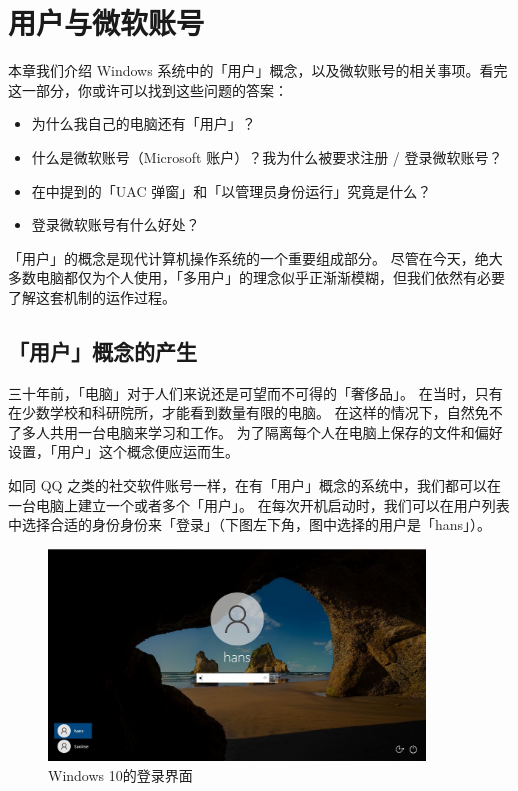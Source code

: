 \chapter{用户与微软账号}
\label{user-and-ms-account}

\begin{intro}
  本章我们介绍 Windows 系统中的「用户」概念，以及微软账号的相关事项。看完这一部分，你或许可以找到这些问题的答案：

  \begin{itemize}
    \item 为什么我自己的电脑还有「用户」？
    \item 什么是微软账号（Microsoft 账户\footnotemark）？我为什么被要求注册 / 登录微软账号？
    \item 在中提到的「UAC 弹窗」和「以管理员身份运行」究竟是什么？
    \item 登录微软账号有什么好处？
  \end{itemize}
\end{intro}

「用户」的概念是现代计算机操作系统的一个重要组成部分。
尽管在今天，绝大多数电脑都仅为个人使用，「多用户」的理念似乎正渐渐模糊，但我们依然有必要了解这套机制的运作过程。

\section{「用户」概念的产生}

三十年前，「电脑」对于人们来说还是可望而不可得的「奢侈品」。
在当时，只有在少数学校和科研院所，才能看到数量有限的电脑。
在这样的情况下，自然免不了多人共用一台电脑来学习和工作。
为了隔离每个人在电脑上保存的文件和偏好设置，「用户」这个概念便应运而生。

如同 QQ 之类的社交软件账号一样，在有「用户」概念的系统中，我们都可以在一台电脑上建立一个或者多个「用户」。
在每次开机启动时，我们可以在用户列表中选择合适的身份身份来「登录」（下图左下角，图中选择的用户是「hans」）。

\begin{figure}[htb!]
  \centering
  \includegraphics[width=10cm]{assets/Login.jpg}
  \caption{Windows 10的登录界面}
  \label{Login}
\end{figure}

